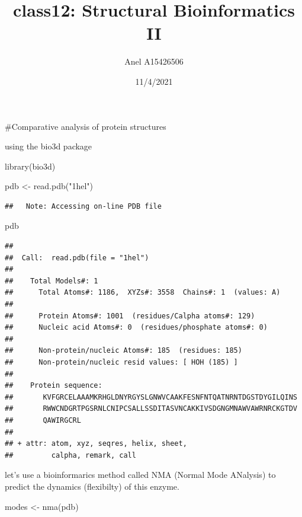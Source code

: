 \documentclass[
]{article}
\title{class12: Structural Bioinformatics II}
\author{Anel A15426506}
\date{11/4/2021}
\newenvironment{Shaded}{\begin{snugshade}}{\end{snugshade}}
\newcommand{\FunctionTok}[1]{\textcolor[rgb]{0.00,0.00,0.00}{#1}}
\newcommand{\NormalTok}[1]{#1}
\newcommand{\OtherTok}[1]{\textcolor[rgb]{0.56,0.35,0.01}{#1}}
\newcommand{\StringTok}[1]{\textcolor[rgb]{0.31,0.60,0.02}{#1}}
\begin{document}
\maketitle

\#Comparative analysis of protein structures

using the bio3d package

\begin{Shaded}
\begin{Highlighting}[]
\FunctionTok{library}\NormalTok{(bio3d)}

\NormalTok{pdb }\OtherTok{\textless{}{-}} \FunctionTok{read.pdb}\NormalTok{(}\StringTok{"1hel"}\NormalTok{)}
\end{Highlighting}
\end{Shaded}

\begin{verbatim}
##   Note: Accessing on-line PDB file
\end{verbatim}

\begin{Shaded}
\begin{Highlighting}[]
\NormalTok{pdb}
\end{Highlighting}
\end{Shaded}

\begin{verbatim}
## 
##  Call:  read.pdb(file = "1hel")
## 
##    Total Models#: 1
##      Total Atoms#: 1186,  XYZs#: 3558  Chains#: 1  (values: A)
## 
##      Protein Atoms#: 1001  (residues/Calpha atoms#: 129)
##      Nucleic acid Atoms#: 0  (residues/phosphate atoms#: 0)
## 
##      Non-protein/nucleic Atoms#: 185  (residues: 185)
##      Non-protein/nucleic resid values: [ HOH (185) ]
## 
##    Protein sequence:
##       KVFGRCELAAAMKRHGLDNYRGYSLGNWVCAAKFESNFNTQATNRNTDGSTDYGILQINS
##       RWWCNDGRTPGSRNLCNIPCSALLSSDITASVNCAKKIVSDGNGMNAWVAWRNRCKGTDV
##       QAWIRGCRL
## 
## + attr: atom, xyz, seqres, helix, sheet,
##         calpha, remark, call
\end{verbatim}

let's use a bioinformarics method called NMA (Normal Mode ANalysis) to
predict the dynamics (flexibilty) of this enzyme.

\begin{Shaded}
\begin{Highlighting}[]
\NormalTok{modes }\OtherTok{\textless{}{-}} \FunctionTok{nma}\NormalTok{(pdb)}
\end{Highlighting}
\end{Shaded}
\end{document}
